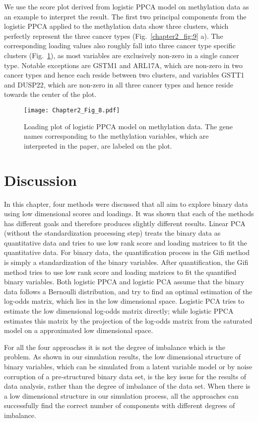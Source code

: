 We use the score plot derived from logistic PPCA model on methylation data as an example to interpret the result. The first two principal components from the logistic PPCA applied to the methylation data show three clusters, which perfectly represent the three cancer types (Fig.~\ref{chapter2_fig:9} a). The corresponding loading values also roughly fall into three cancer type specific clusters (Fig.~\ref{chapter2_fig:10}), as most variables are exclusively non-zero in a single cancer type. Notable exceptions are GSTM1 and ARL17A, which are non-zero in two cancer types and hence each reside between two clusters, and variables GSTT1 and DUSP22, which are non-zero in all three cancer types and hence reside towards the center of the plot.
\begin{figure}[htbp]
    \centering
    \texttt{[image: Chapter2\_Fig\_8.pdf]}
    \caption{Loading plot of logistic PPCA model on methylation data. The gene names corresponding to the methylation variables, which are interpreted in the paper, are labeled on the plot.}
    \label{chapter2_fig:10}
\end{figure}

\section{Discussion}
In this chapter, four methods were discussed that all aim to explore binary data using low dimensional scores and loadings. It was shown that each of the methods has different goals and therefore produces slightly different results. Linear PCA (without the standardization processing step) treats the binary data as quantitative data and tries to use low rank score and loading matrices to fit the quantitative data. For binary data, the quantification process in the Gifi method is simply a standardization of the binary variables. After quantification, the Gifi method tries to use low rank score and loading matrices to fit the quantified binary variables. Both logistic PPCA and logistic PCA assume that the binary data follows a Bernoulli distribution, and try to find an optimal estimation of the log-odds matrix, which lies in the low dimensional space. Logistic PCA tries to estimate the low dimensional log-odds matrix directly; while logistic PPCA estimates this matrix by the projection of the log-odds matrix from the saturated model on a approximated low dimensional space.

For all the four approaches it is not the degree of imbalance which is the problem. As shown in our simulation results, the low dimensional structure of binary variables, which can be simulated from a latent variable model or by noise corruption of a pre-structured binary data set, is the key issue for the results of data analysis, rather than the degree of imbalance of the data set. When there is a low dimensional structure in our simulation process, all the approaches can successfully find the correct number of components with different degrees of imbalance.

